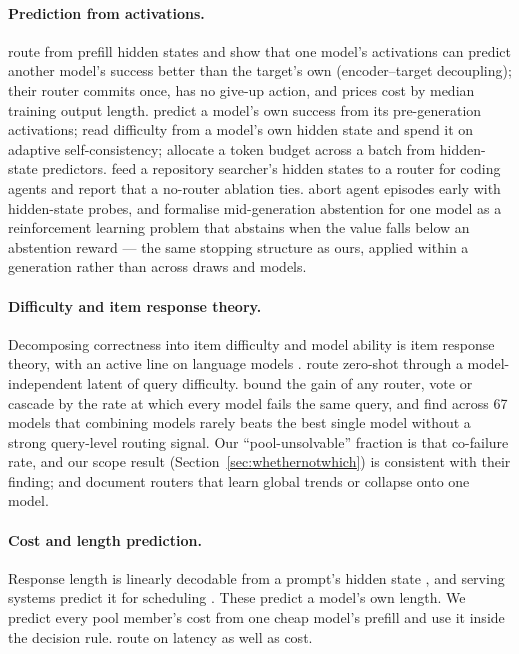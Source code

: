 \documentclass[10pt]{article} %
\begin{document}
\paragraph{Prediction from activations.}
\citet{prefillrouter2026} route from prefill hidden states and show that one model's activations
can predict another model's success better than the target's own (encoder--target decoupling);
their router commits once, has no give-up action, and prices cost by median training output
length.  \citet{encodefailures2026} predict a model's own success from its pre-generation
activations; \citet{llmalreadyknows2025} read difficulty from a model's own hidden state and
spend it on adaptive self-consistency; \citet{predictivescheduling2026} allocate a token budget
across a batch from hidden-state predictors.  \citet{scouting2026} feed a repository searcher's
hidden states to a router for coding agents and report that a no-router ablation ties.
\citet{doomed2026} abort agent episodes early with hidden-state probes, and
\citet{quit2026knowing} formalise mid-generation abstention for one model as a reinforcement
learning problem that abstains when the value falls below an abstention reward --- the same
stopping structure as ours, applied within a generation rather than across draws and models.

\paragraph{Difficulty and item response theory.}
Decomposing correctness into item difficulty and model ability is item response theory, with an
active line on language models \citep{jeirt2025,irtnet2025,cmirt2026,adaptivetesting2025}.
\citet{universallatent2026} route zero-shot through a model-independent latent of query
difficulty.  \citet{cofailure2026} bound the gain of any router, vote or cascade by the rate at
which every model fails the same query, and find across 67 models that combining models rarely
beats the best single model without a strong query-level routing signal.  Our ``pool-unsolvable''
fraction is that co-failure rate, and our scope result (Section~\ref{sec:whethernotwhich}) is
consistent with their finding; \citet{routingplateau2026} and \citet{routingcollapse2026}
document routers that learn global trends or collapse onto one model.

\paragraph{Cost and length prediction.}
Response length is linearly decodable from a prompt's hidden state \citep{howmuchleft2026}, and
serving systems predict it for scheduling \citep{trail2024,entropylength2026}.  These predict a
model's own length.  We predict every pool member's cost from one cheap model's prefill and use it
inside the decision rule.  \citet{latencyrouting2026} route on latency as well as cost.
\end{document}
